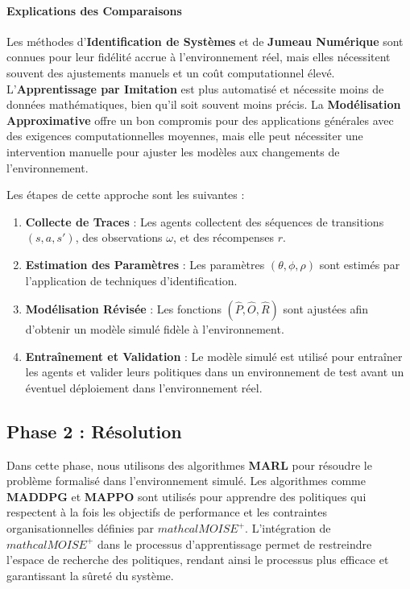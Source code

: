 \documentclass[sigconf,anonymous]{aamas}
\begin{document}
\paragraph{Explications des Comparaisons}

Les méthodes d'\textbf{Identification de Systèmes} et de \textbf{Jumeau Numérique} sont connues pour leur fidélité accrue à l'environnement réel, mais elles nécessitent souvent des ajustements manuels et un coût computationnel élevé. L'\textbf{Apprentissage par Imitation} est plus automatisé et nécessite moins de données mathématiques, bien qu'il soit souvent moins précis. La \textbf{Modélisation Approximative} offre un bon compromis pour des applications générales avec des exigences computationnelles moyennes, mais elle peut nécessiter une intervention manuelle pour ajuster les modèles aux changements de l'environnement.

Les étapes de cette approche sont les suivantes :
\begin{enumerate}
    \item \textbf{Collecte de Traces} : Les agents collectent des séquences de transitions $(s, a, s')$, des observations $\omega$, et des récompenses $r$.
    \item \textbf{Estimation des Paramètres} : Les paramètres $(\theta, \phi, \rho)$ sont estimés par l'application de techniques d'identification.
    \item \textbf{Modélisation Révisée} : Les fonctions $(\hat{P}, \hat{O}, \hat{R})$ sont ajustées afin d'obtenir un modèle simulé fidèle à l'environnement.
    \item \textbf{Entraînement et Validation} : Le modèle simulé est utilisé pour entraîner les agents et valider leurs politiques dans un environnement de test avant un éventuel déploiement dans l'environnement réel.
\end{enumerate}



\subsection{Phase 2 : Résolution}
Dans cette phase, nous utilisons des algorithmes \textbf{MARL} pour résoudre le problème formalisé dans l'environnement simulé. Les algorithmes comme \textbf{MADDPG} et \textbf{MAPPO} sont utilisés pour apprendre des politiques qui respectent à la fois les objectifs de performance et les contraintes organisationnelles définies par \textbf{$mathcal{M}OISE^+$}. L'intégration de \textbf{$mathcal{M}OISE^+$} dans le processus d'apprentissage permet de restreindre l'espace de recherche des politiques, rendant ainsi le processus plus efficace et garantissant la sûreté du système.
\end{document}
